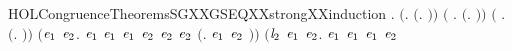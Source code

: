 \begin{SaveVerbatim}{HOLCongruenceTheoremsSGXXGSEQXXstrongXXinduction}
\HOLTokenTurnstile{} \HOLSymConst{\HOLTokenForall{}}.
       \ensuremath{(}\HOLSymConst{\HOLTokenForall{}}.  \ensuremath{(}\HOLTokenLambda{}. \ensuremath{)}\ensuremath{)} \HOLSymConst{\HOLTokenConj{}} \ensuremath{(}\HOLSymConst{\HOLTokenForall{}} .   \HOLSymConst{\HOLTokenImp{}}  \ensuremath{(}\HOLTokenLambda{}.  \HOLSymConst{\ensuremath{\ldotp}} \ensuremath{)}\ensuremath{)} \HOLSymConst{\HOLTokenConj{}}
       \ensuremath{(}\HOLSymConst{\HOLTokenForall{}} .   \HOLSymConst{\HOLTokenConj{}}   \HOLSymConst{\HOLTokenConj{}}   \HOLSymConst{\HOLTokenImp{}}  \ensuremath{(}\HOLTokenLambda{}. \HOLSymConst{\ensuremath{\ldotp}} \ensuremath{)}\ensuremath{)} \HOLSymConst{\HOLTokenConj{}}
       \ensuremath{(}\HOLSymConst{\HOLTokenForall{}}\ensuremath{\HOLBoundVar{e}\sb{\mathrm{1}}} \ensuremath{\HOLBoundVar{e}\sb{\mathrm{2}}}.
             \ensuremath{\HOLBoundVar{e}\sb{\mathrm{1}}} \HOLSymConst{\HOLTokenConj{}}  \ensuremath{\HOLBoundVar{e}\sb{\mathrm{1}}} \HOLSymConst{\HOLTokenConj{}}  \ensuremath{\HOLBoundVar{e}\sb{\mathrm{1}}} \HOLSymConst{\HOLTokenConj{}}  \ensuremath{\HOLBoundVar{e}\sb{\mathrm{2}}} \HOLSymConst{\HOLTokenConj{}}  \ensuremath{\HOLBoundVar{e}\sb{\mathrm{2}}} \HOLSymConst{\HOLTokenConj{}}  \ensuremath{\HOLBoundVar{e}\sb{\mathrm{2}}} \HOLSymConst{\HOLTokenImp{}}
             \ensuremath{(}\HOLTokenLambda{}. \HOLConst{\ensuremath{\tau}}\HOLSymConst{\ensuremath{\ldotp}}\ensuremath{\HOLBoundVar{e}\sb{\mathrm{1}}}  \HOLSymConst{\ensuremath{+}} \HOLConst{\ensuremath{\tau}}\HOLSymConst{\ensuremath{\ldotp}}\ensuremath{\HOLBoundVar{e}\sb{\mathrm{2}}} \ensuremath{)}\ensuremath{)} \HOLSymConst{\HOLTokenConj{}}
       \ensuremath{(}\HOLSymConst{\HOLTokenForall{}}\ensuremath{\HOLBoundVar{l}\sb{\mathrm{2}}} \ensuremath{\HOLBoundVar{e}\sb{\mathrm{1}}} \ensuremath{\HOLBoundVar{e}\sb{\mathrm{2}}}.
             \ensuremath{\HOLBoundVar{e}\sb{\mathrm{1}}} \HOLSymConst{\HOLTokenConj{}}  \ensuremath{\HOLBoundVar{e}\sb{\mathrm{1}}} \HOLSymConst{\HOLTokenConj{}}  \ensuremath{\HOLBoundVar{e}\sb{\mathrm{1}}} \HOLSymConst{\HOLTokenConj{}}  \ensuremath{\HOLBoundVar{e}\sb{\mathrm{2}}} \HOLSymConst{\HOLTokenImp{}}

\end{SaveVerbatim}
